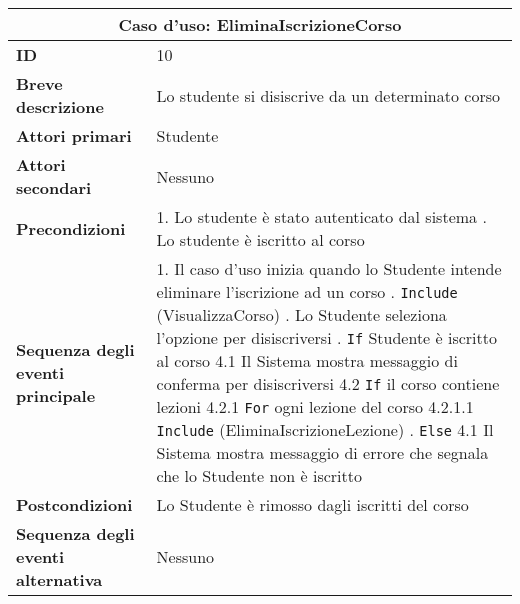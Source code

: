 \documentclass[11pt,a4paper]{report}
\begin{document}
\begin{table}[h!]
\centering
\renewcommand{\arraystretch}{1.3}
\begin{tabular}{|p{4cm}|p{10cm}|}
\hline
\multicolumn{2}{|c|}{\textbf{Caso d’uso: EliminaIscrizioneCorso} }\\ \hline
\textbf{ID} & 10 \\ \hline
\textbf{Breve descrizione} & Lo studente si disiscrive da un determinato corso \\ \hline
\textbf{Attori primari} & Studente \\ \hline
\textbf{Attori secondari} & Nessuno \\ \hline
\textbf{Precondizioni} &
1. Lo studente è stato autenticato dal sistema \newline
2. Lo studente è iscritto al corso \\ \hline
\textbf{Sequenza degli eventi principale} &
1. Il caso d’uso inizia quando lo Studente intende eliminare l’iscrizione ad un corso \newline
2. \texttt{Include} (VisualizzaCorso) \newline
3. Lo Studente seleziona l’opzione per disiscriversi \newline
4. \texttt{If} Studente è iscritto al corso \newline
\hspace*{0.5cm} 4.1 Il Sistema mostra messaggio di conferma per disiscriversi \newline
\hspace*{0.5cm} 4.2 \texttt{If} il corso contiene lezioni \newline
\hspace*{1cm} 4.2.1 \texttt{For} ogni lezione del corso \newline
\hspace*{1.5cm} 4.2.1.1 \texttt{Include} (EliminaIscrizioneLezione) \newline
5. \texttt{Else} \newline
\hspace*{0.5cm} 4.1 Il Sistema mostra messaggio di errore che segnala che lo Studente non è iscritto \\ \hline
\textbf{Postcondizioni} & Lo Studente è rimosso dagli iscritti del corso \\ \hline
\textbf{Sequenza degli eventi alternativa} & Nessuno \\ \hline
\end{tabular}
\end{table}
\newpage

\end{document}

